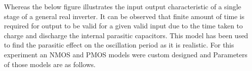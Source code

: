 \documentclass[a4paper,11pt]{article}%
\begin{document}
\begin{figure}[H]
	\centering
	\hfill
\end{figure}

Whereas the below figure illustrates the input output characteristic of a single stage of a general real inverter. It can be observed that finite amount of time is required for output to be valid for a given valid input due to the time taken to charge and discharge the internal parasitic capacitors. This model has  been used to find the parasitic effect on the oscillation period as it is realistic. For this experiment an NMOS and PMOS models were custom designed and Parameters of those models are as follows.
\end{document}
